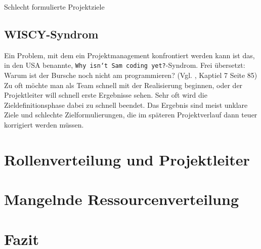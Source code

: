\documentclass[12pt]{scrartcl}
\begin{document}
Schlecht formulierte Projektziele 

\subsection{WISCY-Syndrom}
Ein Problem, mit dem ein Projektmanagement konfrontiert werden kann ist das, in den USA benannte, \texttt{Why isn`t Sam coding yet?}-Syndrom. Frei übersetzt: Warum ist der Bursche noch nicht am programmieren? (Vgl. \cite{proj_zum_erfolg_fuehren}, Kaptiel 7 Seite 85) \\
Zu oft möchte man als Team schnell mit der Realisierung beginnen, oder der Projektleiter will schnell erste Ergebnisse sehen. Sehr oft wird die Zieldefinitionsphase dabei zu schnell beendet. Das Ergebnis sind meist unklare Ziele und schlechte Zielformulierungen, die im späteren Projektverlauf dann teuer korrigiert werden müssen.

\pagebreak
\section{Rollenverteilung und Projektleiter}

\pagebreak
\section{Mangelnde Ressourcenverteilung}

\pagebreak
\section{Fazit}

\pagebreak
{} %

\appendix
\end{document}
